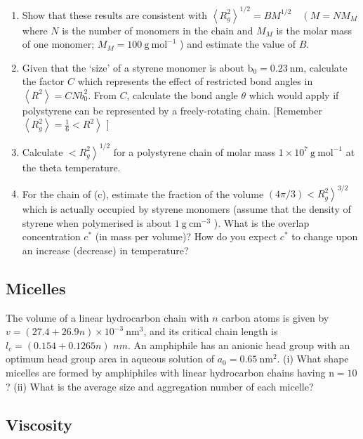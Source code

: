 \documentclass[
  letterpaper,
  enabledeprecatedfontcommands]{report}
\providecommand{\tightlist}{%
  \setlength{\itemsep}{0pt}\setlength{\parskip}{0pt}}
\begin{document}
\begin{enumerate}
\def\labelenumi{(\alph{enumi})}
\tightlist
\item
  Show that these results are consistent with
  \(\left\langle R_{g}^{2}\right\rangle^{1 / 2}=B M^{1 / 2} \quad\left(M=N M_{M}\right.\)
  where \(N\) is the number of monomers in the chain and \(M_{M}\) is
  the molar mass of one monomer;
  \(M_{M}=100 \mathrm{~g} \mathrm{~mol}^{-1}\) ) and estimate the value
  of \(B\).
\item
  Given that the `size' of a styrene monomer is about
  \(\mathrm{b}_{0}=0.23 \mathrm{~nm}\), calculate the factor \(C\) which
  represents the effect of restricted bond angles in
  \(\left\langle R^{2}\right\rangle=C N b_{0}^{2}\). From \(C\),
  calculate the bond angle \(\theta\) which would apply if polystyrene
  can be represented by a freely-rotating chain. {[}Remember
  \(\left.\left\langle R_{g}^{2}\right\rangle=\frac{1}{6}<R^{2}\right\rangle\)
  {]}
\item
  Calculate \(\left.<R_{g}^{2}\right\rangle^{1 / 2}\) for a polystyrene
  chain of molar mass \(1 \times 10^{7} \mathrm{~g} \mathrm{~mol}^{-1}\)
  at the theta temperature.
\item
  For the chain of (c), estimate the fraction of the volume
  \(\left.(4 \pi / 3)<R_{g}^{2}\right\rangle^{3 / 2}\) which is actually
  occupied by styrene monomers (assume that the density of styrene when
  polymerised is about \(1 \mathrm{~g} \mathrm{~cm}^{-3}\) ). What is
  the overlap concentration \(c^{*}\) (in mass per volume)? How do you
  expect \(c^{*}\) to change upon an increase (decrease) in temperature?
\end{enumerate}

\subsection{Micelles}\label{micelles}

The volume of a linear hydrocarbon chain with \(n\) carbon atoms is
given by \(v=(27.4+26.9 n) \times 10^{-3} \mathrm{~nm}^{3}\), and its
critical chain length is \(l_{c}=(0.154+0.1265 n)\) \(n m\). An
amphiphile has an anionic head group with an optimum head group area in
aqueous solution of \(a_{0}=0.65 \mathrm{~nm}^{2}\). (i) What shape
micelles are formed by amphiphiles with linear hydrocarbon chains having
\(\mathrm{n}=10\) ? (ii) What is the average size and aggregation number
of each micelle?

\subsection{Viscosity}\label{viscosity}
\end{document}
